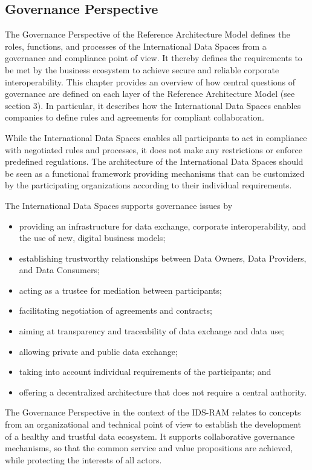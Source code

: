 
\subsection{Governance Perspective}


The Governance Perspective of the Reference Architecture Model defines the roles, functions, and processes of the International Data Spaces from a governance and compliance point of view. It thereby defines the requirements to be met by the business ecosystem to achieve secure and reliable corporate interoperability. This chapter provides an overview of how central questions of governance are defined on each layer of the Reference Architecture Model (see section 3). In particular, it describes how the International Data Spaces enables companies to define rules and agreements for compliant collaboration.

While the International Data Spaces enables all participants to act in compliance with negotiated rules and processes, it does not make any restrictions or enforce predefined regulations. The architecture of the International Data Spaces should be seen as a functional framework providing mechanisms that can be customized by the participating organizations according to their individual requirements.

The International Data Spaces supports governance issues by
\begin{itemize}
	\item providing an infrastructure for data exchange, corporate interoperability, and the use of new, digital business models;
	\item establishing trustworthy relationships between Data Owners, Data Providers, and Data Consumers;
	\item acting as a trustee for mediation between participants;
	\item facilitating negotiation of agreements and contracts;
	\item aiming at transparency and traceability of data exchange and data use;
	\item allowing private and public data exchange;
	\item taking into account individual requirements of the participants; and
	\item offering a decentralized architecture that does not require a central authority.
\end{itemize}


The Governance Perspective in the context of the IDS-RAM relates to concepts from an organizational and technical point of view to establish the development of a healthy and trustful data ecosystem. It supports collaborative governance mechanisms, so that the common service and value propositions are achieved, while protecting the interests of all actors. 

